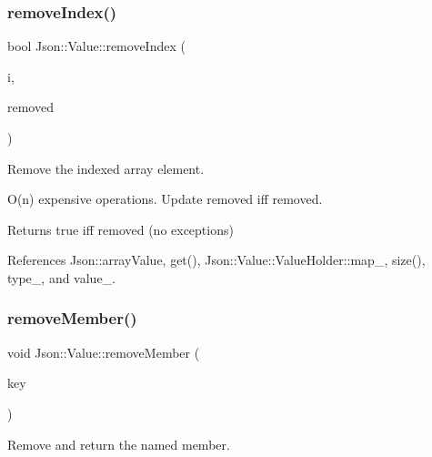 \subsubsection{\texorpdfstring{remove\+Index()}{removeIndex()}}
{\footnotesize\ttfamily bool Json\+::\+Value\+::remove\+Index (\begin{DoxyParamCaption}\item[{\hyperlink{classJson_1_1Value_a184a91566cccca7b819240f0d5561c7d_a184a91566cccca7b819240f0d5561c7d}{Array\+Index}}]{i,  }\item[{\hyperlink{classJson_1_1Value}{Value} $\ast$}]{removed }\end{DoxyParamCaption})}



Remove the indexed array element. 

O(n) expensive operations. Update \textquotesingle{}removed\textquotesingle{} iff removed. \begin{DoxyReturn}{Returns}
true iff removed (no exceptions) 
\end{DoxyReturn}


References Json\+::array\+Value, get(), Json\+::\+Value\+::\+Value\+Holder\+::map\+\_\+, size(), type\+\_\+, and value\+\_\+.

\mbox{\label{classJson_1_1Value_a92e165f04105d27a930fb3a18a053585_a92e165f04105d27a930fb3a18a053585}} 
\subsubsection{\texorpdfstring{remove\+Member()}{removeMember()}\hspace{0.1cm}{\footnotesize\ttfamily [1/5]}}
{\footnotesize\ttfamily void Json\+::\+Value\+::remove\+Member (\begin{DoxyParamCaption}\item[{const char $\ast$}]{key }\end{DoxyParamCaption})}



Remove and return the named member. 

